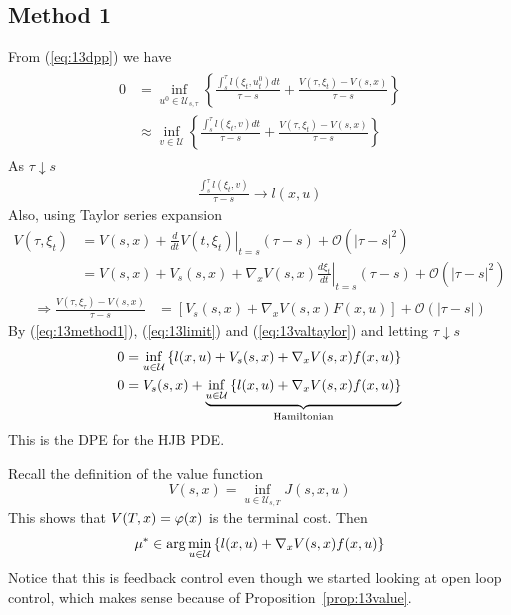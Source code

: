 \subsection{Method 1}
From (\ref{eq:13dpp}) we have
\begin{align}
\label{eq:13method1}
\begin{split}
0 &= \inf_{u^0\in\mathcal{U}_{s,\tau}} \left\lbrace \frac{\int_s^\tau l(\xi_t,u_t^0)dt}{\tau-s} + \frac{V(\tau,\xi_t)-V(s,x)}{\tau-s} \right\rbrace \\
&\approx\inf_{v\in\mathcal{U}} \left\lbrace \frac{\int_s^\tau l(\xi_t,v)dt}{\tau-s} + \frac{V(\tau,\xi_t)-V(s,x)}{\tau-s} \right\rbrace
\end{split}
\end{align}
As $\tau\downarrow s$
\begin{align}
\label{eq:13limit}
\frac{\int_s^\tau l(\xi_t,v)}{\tau-s} \to l(x,u)
\end{align}
Also, using Taylor series expansion
\begin{align*}
V(\tau,\xi_t) &= V(s,x) + \left.\frac{d}{dt}V(t,\xi_t)\right|_{t=s}(\tau-s) + \mathcal{O}(|\tau-s|^2) \\
&= V(s,x) + V_s(s,x) + \nabla_x V(s,x) \left.\frac{d\xi_t}{dt}\right|_{t=s}(\tau-s) + \mathcal{O}(|\tau-s|^2)
\end{align*}
\begin{align}
\label{eq:13valtaylor}
\Rightarrow \frac{V(\tau,\xi_\tau)-V(s,x)}{\tau-s} &= \left[V_s(s,x) + \nabla_x V(s,x)F(x,u)\right] + \mathcal{O}(|\tau-s|)
\end{align}
By (\ref{eq:13method1}), (\ref{eq:13limit}) and (\ref{eq:13valtaylor}) and letting $\tau\downarrow s$
\begin{align*}
0 &= \inf_{u\in\mathcal{U}} \left\lbrace l(x,u) + V_s(s,x) + \nabla_x V(s,x)f(x,u) \right\rbrace \\
0 &= V_s(s,x) + \underbrace{\inf_{u\in\mathcal{U}} \left\lbrace l(x,u) + \nabla_x V(s,x)f(x,u) \right\rbrace}_{\text{Hamiltonian}}
\end{align*}
This is the DPE for the HJB PDE\@.

Recall the definition of the value function
$$V(s,x) = \inf_{u\in\mathcal{U}_{s,T}} J(s,x,u)$$
This shows that $V(T,x) = \varphi(x)$ is the terminal cost.
Then
$$\mu^\ast \in \arg\min_{u\in\mathcal{U}} \left\lbrace l(x,u) + \nabla_x V(s,x) f(x,u) \right\rbrace$$
Notice that this is feedback control even though we started looking at open loop control, which makes sense because of Proposition~\ref{prop:13value}.

